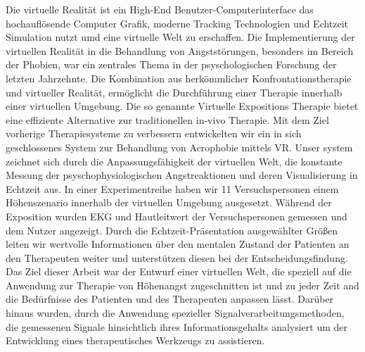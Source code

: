 

Die virtuelle Realität ist ein High-End Benutzer-Computerinterface das hochauflösende Computer Grafik, moderne Tracking Technologien und Echtzeit Simulation nutzt umd eine virtuelle Welt zu erschaffen. Die Implementierung der virtuellen Realität in die Behandlung von Angststörungen, besonders im Bereich der Phobien, war ein zentrales Thema in der psyschologischen Forschung der letzten Jahrzehnte. Die Kombination aus herkömmlicher Konfrontationstherapie und virtueller Realität, ermöglicht die Durchführung einer Therapie innerhalb einer virtuellen Umgebung. Die so genannte Virtuelle Expositions Therapie bietet eine effiziente Alternative zur traditionellen in-vivo Therapie. Mit dem Ziel vorherige Therapiesysteme zu verbessern entwickelten wir ein in sich geschlossenes System zur Behandlung von Acrophobie mittels VR. Unser system zeichnet sich durch die Anpassungsfähigkeit der virtuellen Welt, die konstante Messung der psyschophysiologischen Angstreaktionen und deren Visualisierung in Echtzeit aus. In einer Experimentreihe haben wir 11 Versuchspersonen einem Höhenszenario innerhalb der virtuellen Umgebung ausgesetzt. Während der Exposition wurden EKG und Hautleitwert der Versuchspersonen gemessen und dem Nutzer angezeigt. Durch die Echtzeit-Präsentation ausgewählter Größen leiten wir wertvolle Informationen über den mentalen Zustand der Patienten an den Therapeuten weiter und unterstützen diesen bei der Entscheidungsfindung. Das Ziel dieser Arbeit war der Entwurf einer virtuellen Welt, die speziell auf die Anwendung zur Therapie von Höhenangst zugeschnitten ist und zu jeder Zeit and die Bedürfnisse des Patienten und des Therapeuten anpassen lässt. Darüber hinaus wurden, durch die Anwendung spezieller Signalverarbeitungsmethoden, die gemessenen Signale hinsichtlich ihres Informationsgehalts analysiert um der Entwicklung eines therapeutisches Werkzeugs zu assistieren. 
